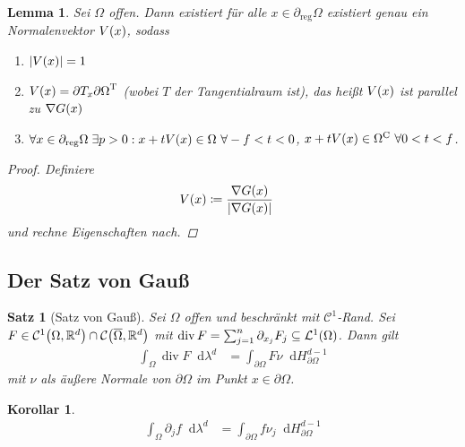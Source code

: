 \documentclass[11pt, twoside, a4paper]{article}
\theoremstyle{plain}
\newtheorem{lemma}[blockelement]{Lemma}
\newtheorem{satz}[blockelement]{Satz}
\newtheorem{korollar}[blockelement]{Korollar}
\numberwithin{equation}{subsection}
\newcommand{\of}[1]{\mathopen{}\mathclose{}\bgroup\left(#1\aftergroup\egroup\right)}
\newcommand{\abs}[1]{\left\lvert#1\right\rvert}
\newcommand{\dif}{\mathop{}\!\mathrm{d}}
\newcommand{\ex}{\;\exists}
\newcommand{\comp}[1]{{#1}^{\mathrm{C}}}
\DeclareMathOperator{\fdiv}{div}
\newcommand{\R}{\mathbb{R}}
\newcommand{\mC}{\mathcal{C}}
\newcommand{\mL}{\mathcal{L}}
\begin{document}
    \begin{lemma}
        Sei $\Omega$ offen. Dann existiert für alle $x\in\partial_{\text{reg}}\Omega$ existiert genau ein Normalenvektor $V\of{x}$, sodass
        \begin{enumerate}[label=(\roman*)]
            \item $\abs{V\of{x}} = 1$
            \item $V\of{x} = \partial{T_x\partial \Omega}^{\mathrm{T}}$ (wobei $T$ der Tangentialraum ist), das heißt $V\of{x}$ ist parallel zu $\nabla G\of{x}$
            \item $\forall x\in\partial_{\text{reg}}\Omega\ex p > 0: x+tV\of{x} \in\Omega~\forall -f < t < 0$, $x+ tV\of{x}\in\comp{\Omega}~\forall 0 < t < f$.
        \end{enumerate}
        \begin{proof}
            Definiere
            \begin{align*}
                V\of{x} &\coloneqq \frac{\nabla G\of{x}}{\abs{\nabla G\of{x}}}
            \end{align*}
            und rechne Eigenschaften nach.\qedhere
        \end{proof}
    \end{lemma}

    \subsection{Der Satz von Gauß}

    \begin{satz}[Satz von Gauß]
        \label{satz:von-gauss}
        Sei $\Omega$ offen und beschränkt mit $\mC^1$-Rand. Sei $F\in\mC^{1}\of{\Omega, \R^d} \cap \mC\of{\overline{\Omega}, \R^d}$ mit $\fdiv F = \sum_{j=1}^{n} \partial_{x_j} F_j \subseteq \mL^1\of{\Omega}$. Dann gilt
        \begin{align*}
            \int_{\Omega}^{} \fdiv F \dif \lambda^d &= \int_{\partial\Omega}^{} F\nu \dif H_{\partial \Omega}^{d-1}
        \end{align*}
        mit $\nu$ als äußere Normale von $\partial \Omega$ im Punkt $x\in\partial\Omega$.
    \end{satz}

    \begin{korollar}
        \begin{align*}
            \int_{\Omega}^{} \partial_j f \dif \lambda^d &= \int_{\partial\Omega}^{} f\nu_j \dif H_{\partial\Omega}^{d-1}
        \end{align*}
    \end{korollar}
\end{document}
